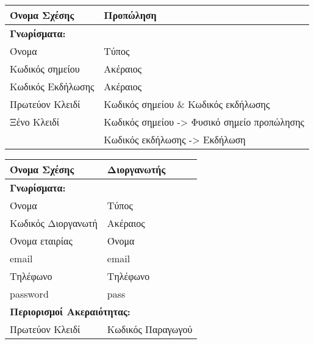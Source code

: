 \begin{tabular}{|p{6cm}|p{8cm}|}
  \hline
  Όνομα Σχέσης      & Προπώληση                            \\ \hline
  \multicolumn{2}{|l|}{\textbf{Γνωρίσματα:}}               \\ \hline
  Όνομα             & Τύπος                                \\ \hline
  Κωδικός σημείου   & Ακέραιος                             \\ \hline
  Κωδικός Εκδήλωσης & Ακέραιος                             \\ \hline
  Πρωτεύον Κλειδί   & Κωδικός σημείου \& Κωδικός εκδήλωσης \\ \hline
  Ξένο Κλειδί       & Κωδικός σημείου -> Φυσικό σημείο προπώλησης
                                                           \\ \hline
                    & Κωδικός εκδήλωσης -> Εκδήλωση        \\ \hline
\end{tabular}


\begin{tabular}{|p{6cm}|p{8cm}|}
  \hline
  Όνομα Σχέσης             & Διοργανωτής                   \\ \hline
  \multicolumn{2}{|l|}{\textbf{Γνωρίσματα:}}               \\ \hline
  Όνομα                    & Τύπος                         \\ \hline
  Κωδικός Διοργανωτή       & Ακέραιος                      \\ \hline
  Όνομα εταιρίας           & Όνομα                         \\ \hline
  email                    & email                         \\ \hline
  Τηλέφωνο                 & Τηλέφωνο                      \\ \hline
  password                 & pass                          \\ \hline
  \multicolumn{2}{|l|}{\textbf{Περιορισμοί Ακεραιότητας:}} \\ \hline
  Πρωτεύον Κλειδί          & Κωδικός Παραγωγού             \\ \hline
\end{tabular}


